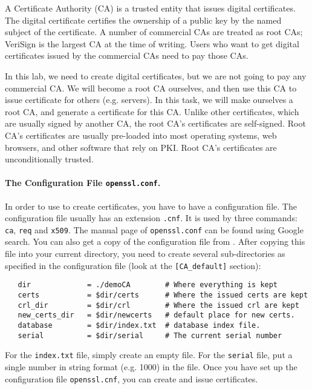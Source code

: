 A Certificate Authority (CA) is a trusted entity that issues digital certificates. 
The digital certificate certifies the ownership of a public key by 
the named subject of the certificate. A number of commercial 
CAs are treated as root CAs; VeriSign is the largest CA at the time of 
writing. Users who want to get digital certificates issued
by the commercial CAs need to pay those CAs.


In this lab, we need to create digital certificates, but we are not going to pay
any commercial CA. We will become a root CA ourselves, and then use this CA to 
issue certificate for others (e.g. servers). In this task, we will make
ourselves a root CA, and generate a certificate for this CA. Unlike 
other certificates, which are usually signed by another CA, the root CA's 
certificates are self-signed. Root CA's certificates are usually pre-loaded
into most operating systems, web browsers, and other software that rely on PKI.
Root CA's certificates are unconditionally trusted.


\paragraph{The Configuration File {\tt openssl.conf}.}
In order to use \OpenSSL to create certificates, you have to have a 
configuration file.
The configuration file usually has an extension
{\tt .cnf}. It is used by three \OpenSSL commands: {\tt ca}, {\tt req} and {\tt x509}. 
The manual page of \texttt{openssl.conf} can be found using Google search.
You can also get a  copy of the configuration file from . 
After copying this file into your current directory, you need to 
create several sub-directories as specified in the configuration file (look
at the {\tt [CA\_default]} section):


\begin{lstlisting}
   dir             = ./demoCA        # Where everything is kept
   certs           = $dir/certs      # Where the issued certs are kept
   crl_dir         = $dir/crl        # Where the issued crl are kept
   new_certs_dir   = $dir/newcerts   # default place for new certs.
   database        = $dir/index.txt  # database index file.
   serial          = $dir/serial     # The current serial number
\end{lstlisting}

For the \texttt{index.txt} file, simply create an empty file. For 
the \texttt{serial} file, put a single number in string format (e.g. 1000) in the file.
Once you have set up the configuration file \texttt{openssl.cnf}, 
you can create and issue certificates.


